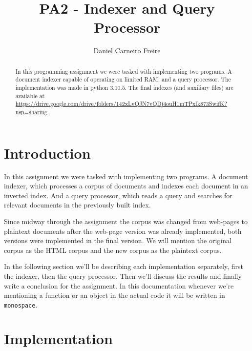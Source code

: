 \documentclass[sigconf,authorversion,nonacm]{acmart}
\def\code#1{\texttt{#1}}
\begin{document}
\title{PA2 - Indexer and Query Processor}

\author{Daniel Carneiro Freire}


\begin{abstract}
  In this programming assignment we were tasked with implementing two programs. A document indexer capable of operating on limited RAM, and a query processor. The implementation was made in python $3.10.5$. The final indexes (and auxiliary files) are available at \url{https://drive.google.com/drive/folders/142xLvQJN7vQDj4ouH1mTPxlk873SwifK?usp=sharing}.
\end{abstract}

\maketitle

\section{Introduction}

In this assignment we were tasked with implementing two programs. A document indexer, which processes a corpus of documents and indexes each document in an inverted index. And a query processor, which reads a query and searches for relevant documents in the previously built index.

Since midway through the assignment the corpus was changed from web-pages to plaintext documents after the web-page version was already implemented, both versions were implemented in the final version. We will mention the original corpus as the HTML corpus and the new corpus as the plaintext corpus.

In the following section we'll be describing each implementation separately, first the indexer, then the query processor. Then we'll discuss the results and finally write a conclusion for the assignment. In this documentation whenever we're mentioning a function or an object in the actual code it will be written in \code{monospace}.

\section{Implementation}
\end{document}
